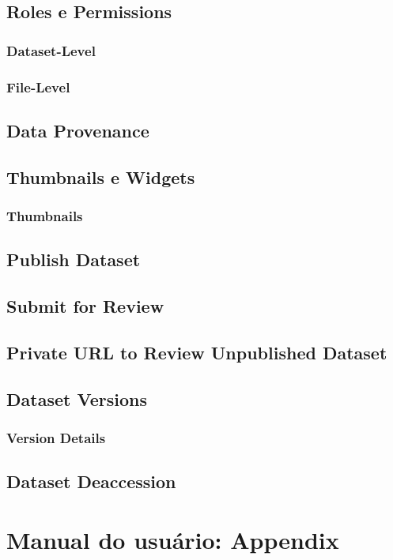 \documentclass[12pt,hidelinks]{article}
\begin{document}
    \subsection{Roles e Permissions}
        \subsubsection{Dataset-Level}
        \subsubsection{File-Level}
    \subsection{Data Provenance}
    \subsection{Thumbnails e Widgets}
        \subsubsection{Thumbnails}
    \subsection{Publish Dataset}
    \subsection{Submit for Review}
    \subsection{Private URL to Review Unpublished Dataset}
    \subsection{Dataset Versions}
         \subsubsection{Version Details}
    \subsection{Dataset Deaccession}
        
\newpage
     	
\section{Manual do usuário: Appendix}
\vspace{10.5cm}
\end{document}
